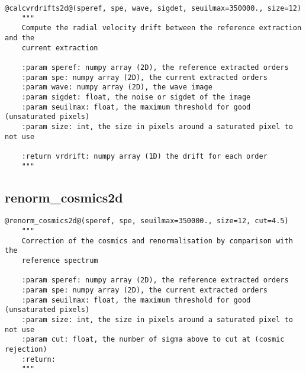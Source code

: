 \begin{lstlisting}[style=pythonstyle]
@calcvrdrifts2d@(speref, spe, wave, sigdet, seuilmax=350000., size=12)
    """
    Compute the radial velocity drift between the reference extraction and the
    current extraction
    
    :param speref: numpy array (2D), the reference extracted orders
    :param spe: numpy array (2D), the current extracted orders
    :param wave: numpy array (2D), the wave image
    :param sigdet: float, the noise or sigdet of the image
    :param seuilmax: float, the maximum threshold for good (unsaturated pixels)
    :param size: int, the size in pixels around a saturated pixel to not use
    
    :return vrdrift: numpy array (1D) the drift for each order 
    """
\end{lstlisting}

\vspace{0.5cm}
\subsection{renorm\_cosmics2d}

\begin{lstlisting}[style=pythonstyle]
@renorm_cosmics2d@(speref, spe, seuilmax=350000., size=12, cut=4.5)
    """
    Correction of the cosmics and renormalisation by comparison with the 
    reference spectrum
    
    :param speref: numpy array (2D), the reference extracted orders
    :param spe: numpy array (2D), the current extracted orders
    :param seuilmax: float, the maximum threshold for good (unsaturated pixels)
    :param size: int, the size in pixels around a saturated pixel to not use
    :param cut: float, the number of sigma above to cut at (cosmic rejection)
    :return:
    """
\end{lstlisting}
